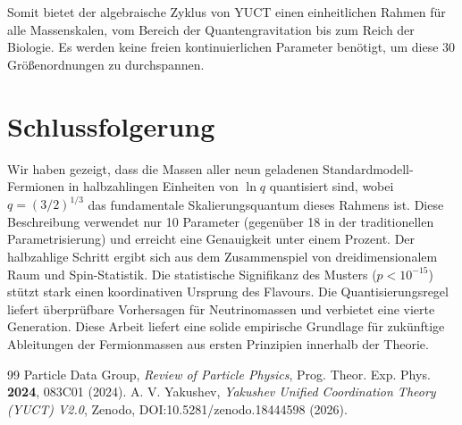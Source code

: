 \documentclass[12pt,a4paper]{article}
\begin{document}
	Somit bietet der algebraische Zyklus von YUCT einen einheitlichen Rahmen für alle Massenskalen, vom Bereich der Quantengravitation bis zum Reich der Biologie. Es werden keine freien kontinuierlichen Parameter benötigt, um diese 30 Größenordnungen zu durchspannen.
	
	\section{Schlussfolgerung}
	
	Wir haben gezeigt, dass die Massen aller neun geladenen Standardmodell-Fermionen in halbzahlingen Einheiten von $\ln q$ quantisiert sind, wobei $q = (3/2)^{1/3}$ das fundamentale Skalierungsquantum dieses Rahmens ist. Diese Beschreibung verwendet nur 10 Parameter (gegenüber 18 in der traditionellen Parametrisierung) und erreicht eine Genauigkeit unter einem Prozent. Der halbzahlige Schritt ergibt sich aus dem Zusammenspiel von dreidimensionalem Raum und Spin-Statistik. Die statistische Signifikanz des Musters ($p < 10^{-15}$) stützt stark einen koordinativen Ursprung des Flavours. Die Quantisierungsregel liefert überprüfbare Vorhersagen für Neutrinomassen und verbietet eine vierte Generation. Diese Arbeit liefert eine solide empirische Grundlage für zukünftige Ableitungen der Fermionmassen aus ersten Prinzipien innerhalb der Theorie.
	
	\begin{thebibliography}{99}
		 Particle Data Group, \textit{Review of Particle Physics}, Prog. Theor. Exp. Phys. \textbf{2024}, 083C01 (2024).
		 A. V. Yakushev, \textit{Yakushev Unified Coordination Theory (YUCT) V2.0}, Zenodo, DOI:10.5281/zenodo.18444598 (2026).
	\end{thebibliography}
	
\end{document}
